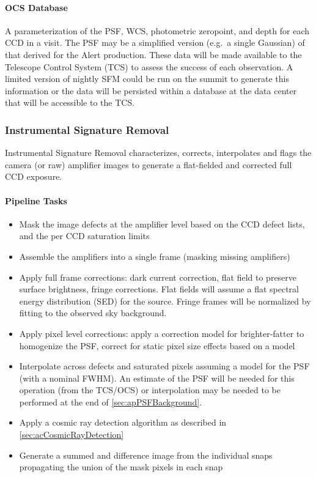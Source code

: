 \paragraph*{OCS Database} A parameterization of the PSF, WCS, photometric zeropoint, and depth for each CCD in a visit. The PSF may be a simplified version (e.g.\ a single Gaussian) of that derived for the Alert production. These data will be made available to the Telescope Control System (TCS) to assess the success of each observation. A limited version of nightly SFM could be run on the summit to generate this information or the  data will be persisted within a database at the data center that will be accessible to the TCS.


\subsubsection{Instrumental Signature Removal}
\label{sec:apISR}
Instrumental Signature Removal characterizes, corrects, interpolates and flags the camera (or raw) amplifier images to generate a flat-fielded and corrected full CCD exposure.

\paragraph{Pipeline Tasks}
\begin{itemize}
\item Mask the image defects at the amplifier level based on the CCD defect lists, and the per CCD saturation limits
\item Assemble the amplifiers into a single frame (masking missing amplifiers)
\item Apply full frame corrections: dark current correction, flat field to preserve surface brightness, fringe corrections. Flat fields will assume a flat spectral energy distribution (SED) for the source. Fringe frames will be normalized by fitting to the observed sky background.
\item Apply pixel level corrections: apply a correction model for brighter-fatter to homogenize the PSF, correct for static pixel size effects based on a model
\item Interpolate across defects and saturated pixels assuming a model for the PSF (with a nominal FWHM). An estimate of the PSF will be needed for this operation (from the TCS/OCS) or interpolation may be needed to be performed at the end of \ref{sec:apPSFBackground}.
\item Apply a cosmic ray detection algorithm as described in \ref{sec:acCosmicRayDetection}
\item Generate a summed and difference image from the individual snaps propagating the union of the mask pixels in each snap
\end{itemize}

